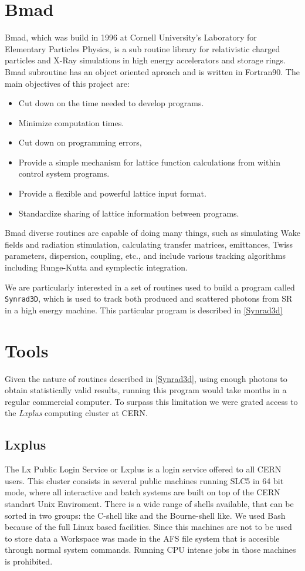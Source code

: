 \section{Bmad}

Bmad, which was build in 1996 at Cornell University's Laboratory for Elementary Particles Physics, is  a sub routine library for relativistic charged particles and X-Ray simulations in high energy accelerators and storage rings. Bmad subroutine has an object oriented aproach and is written in Fortran90. The main objectives of this project are:
	
\begin{itemize}
\item Cut down on the time needed to develop programs.
\item Minimize computation times.
\item Cut down on programming errors,
\item Provide a simple mechanism for lattice function calculations from within control system programs.
\item Provide a flexible and powerful lattice input format.
\item Standardize sharing of lattice information between programs.
\end{itemize}

Bmad diverse routines are capable of doing many things, such as simulating Wake fields and radiation stimulation, calculating transfer matrices, emittances, Twiss parameters,
dispersion, coupling, etc., and include various tracking algorithms including Runge-Kutta and symplectic integration. 


We are particularly interested in a set of routines used to build a program called \texttt{Synrad3D}\xspace , which is used to track both produced and scattered photons from SR in a high energy machine. This particular program is described in \ref{Synrad3d}


\section{Tools}
Given the nature of routines described in \ref{Synrad3d}, using enough photons to obtain statistically valid results, running this program would take months in a regular commercial computer. To surpass this limitation we were grated access to the {\it Lxplus} computing cluster at CERN.
\subsection{Lxplus}
The Lx Public Login Service or Lxplus is a login service offered to all CERN users. This cluster consists in several public machines running SLC5 in 64 bit mode, where all interactive and batch systems are built on top of the CERN standart Unix Enviroment. There is a wide range of shells available, that can be sorted in two groups: the C-shell like and the Bourne-shell like. We used Bash because of the full Linux based facilities. Since this machines are not to be used to store data a Workspace was made in the AFS file system that is accesible through normal system commands. Running CPU intense jobs in those machines is prohibited. 
